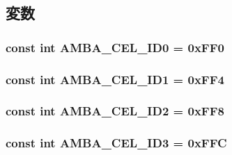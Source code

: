 \subsection{変数}
\hypertarget{classAmbaDevice_a749a0c336bf3249b928dd9b6bb8cd75f}{
\subsubsection[{AMBA\_\-CEL\_\-ID0}]{\setlength{\rightskip}{0pt plus 5cm}const int {\bf AMBA\_\-CEL\_\-ID0} = 0xFF0}}
\label{classAmbaDevice_a749a0c336bf3249b928dd9b6bb8cd75f}
\hypertarget{classAmbaDevice_a9e920cb98d58a4845d818c7f7cfd7370}{
\subsubsection[{AMBA\_\-CEL\_\-ID1}]{\setlength{\rightskip}{0pt plus 5cm}const int {\bf AMBA\_\-CEL\_\-ID1} = 0xFF4}}
\label{classAmbaDevice_a9e920cb98d58a4845d818c7f7cfd7370}
\hypertarget{classAmbaDevice_ae1396143a7fd241c2758b69cbae097e3}{
\subsubsection[{AMBA\_\-CEL\_\-ID2}]{\setlength{\rightskip}{0pt plus 5cm}const int {\bf AMBA\_\-CEL\_\-ID2} = 0xFF8}}
\label{classAmbaDevice_ae1396143a7fd241c2758b69cbae097e3}
\hypertarget{classAmbaDevice_aed8b9f80686a3bd7cdafc05556bb3bbc}{
\subsubsection[{AMBA\_\-CEL\_\-ID3}]{\setlength{\rightskip}{0pt plus 5cm}const int {\bf AMBA\_\-CEL\_\-ID3} = 0xFFC}}
